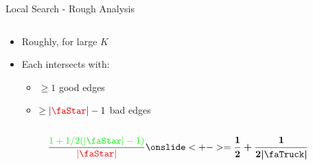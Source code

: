 \begin{frame}{Local Search - Rough Analysis}
\begin{columns}
\begin{column}{.6\textwidth}

\begin{itemize}[<+->]
	\item Roughly, for large $K$
	\item Each {\color{red}\faStar} intersects with:
	\begin{itemize}
	  \item $\geq 1$ good edges
	  \item $\geq |\text{\color{red}\faStar}| - 1$ bad edges
	\end{itemize}
\end{itemize}
\end{column}
\begin{column}{.5\textwidth}

\end{column}
\end{columns}

\onslide<+->
\vfill
$$
\frac{\color{green} 1 + 1/2 (|\text{\faStar}| - 1)}
{\color{red} |\text{\faStar}|} 
\onslide<+->
=
\bm{\frac{1}{2} + \frac{1}{2 |\text{\faTruck}|}}
$$
\end{frame}